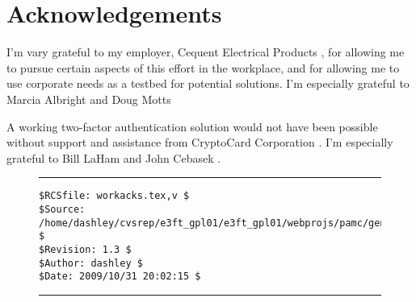 \chapter{Acknowledgements}

I'm vary grateful to my employer, Cequent Electrical 
Products \cite{bibref:c:cequentelectricalproducts}, 
for allowing me
to pursue certain aspects of this effort in the workplace, and for allowing
me to use corporate needs as a testbed for potential solutions.
I'm especially grateful to Marcia Albright \cite{bibref:i:marciaalbright}
and Doug Motts \cite{bibref:i:dougmotts}

A working two-factor authentication solution would not have been
possible without support and assistance from
CryptoCard Corporation \cite{bibref:c:cryptocardcorporation}\@.
I'm especially grateful to Bill LaHam \cite{bibref:i:billlaham}
and John Cebasek \cite{bibref:i:johncebasek}.


\begin{figure}[b]
\noindent\rule[-0.25in]{\textwidth}{1pt}
\begin{tiny}
\begin{verbatim}
$RCSfile: workacks.tex,v $
$Source: /home/dashley/cvsrep/e3ft_gpl01/e3ft_gpl01/webprojs/pamc/gen_a/docs/manual/man_a/comps/workacks.tex,v $
$Revision: 1.3 $
$Author: dashley $
$Date: 2009/10/31 20:02:15 $
\end{verbatim}
\end{tiny}
\noindent\rule[0.25in]{\textwidth}{1pt}
\end{figure}

%
%
%

